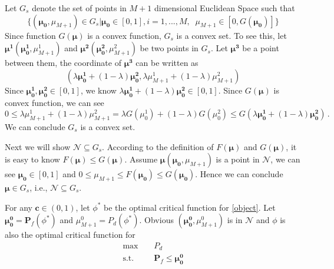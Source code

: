 \documentclass[12pt,journal,a4paper,twoside,onecolumn]{IEEEtran}
\begin{document}
\begin{spacing}{2.5}
Let $G_s$ denote the set of points in $M+1$ dimensional Euclidean Space such that 
\[
 \{(\mathbf{\mu_0}, \mu_{M+1})\in G_s | \mathbf{\mu_0}\in [0, 1], i=1, ..., M,\;\;\mu_{M+1} \in [0, G(\mathbf{\mu_0})]
    \}
\]
Since function $G(\mathbf{\mu})$ is a convex function, $G_s$ is a convex set. To see this, let $\mathbf{\mu^1} (\mathbf{\mu^1_0}, \mu^1_{M+1})$ and $\mathbf{\mu^2} (\mathbf{\mu^2_0}, \mu^2_{M+1})$ be two points in $G_s$. Let $\mathbf{\mu^3}$ be a point between them, the coordinate of $\boldsymbol{\mu}^\mathbf{3}$ can be written as
\[
(\lambda \mathbf{\mu^1_0}+(1-\lambda)\mathbf{\mu^2_0}, \lambda\mu_{M+1}^1 + (1-\lambda)\mu_{M+1}^2)
\]
Since $\mathbf{\mu^1_0}, \mathbf{\mu^2_0} \in [0, 1]$, we know $\lambda \mathbf{\mu^1_0}+(1-\lambda)\mathbf{\mu^2_0} \in [0, 1]$. Since $G(\mathbf{\mu})$ is convex function, we can see
\[
0 \leq \lambda\mu_{M+1}^1 + (1-\lambda)\mu_{M+1}^2 = \lambda G(\mu_0^1) + (1-\lambda)G(\mu_0^2) \leq G(\lambda \mathbf{\mu_0^1}+(1-\lambda)\mathbf{\mu_0^2})\,.
\]
We can conclude $G_s$ is a convex set. 

Next we will show $\mathcal{N} \subseteq G_s$. According to the definition of $F(\mathbf{\mu})$ and $G(\mathbf{\mu})$, it is easy to know $F(\mathbf{\mu}) \leq G(\mathbf{\mu})$. Assume $\mathbf{\mu} (\mathbf{\mu_0}, \mu_{M+1})$ is a point in $\mathcal{N}$, we can see $\mathbf{\mu_0} \in [0, 1]$ and $0 \leq \mu_{M+1} \leq F(\mathbf{\mu_0}) \leq G(\mathbf{\mu_0})$. Hence we can conclude $\mathbf{\mu} \in G_s$, i.e., $\mathcal{N} \subseteq G_s$.

For any $\mathbf{c} \in  (0, 1)$, let $\phi^\ast$ be the optimal critical function for \eqref{object}. Let $\mathbf{\mu_0^0} = \mathbf{P}_f(\phi^\ast)$ and $\mu_{M+1}^0 = P_d(\phi^\ast)$. Obvious $(\mathbf{\mu_0^0}, \mu_{M+1}^0)$ is in $\mathcal{N}$ and $\phi$ is also the optimal critical function for 
\begin{equation}
\begin{split}
\max\;\;\;\;&P_d\\
\text{s.t.}\;\;\;\;&\mathbf{P}_f \leq \mathbf{\mu^0_0}
\end{split}
\end{equation}


\end{spacing}
\end{document}
